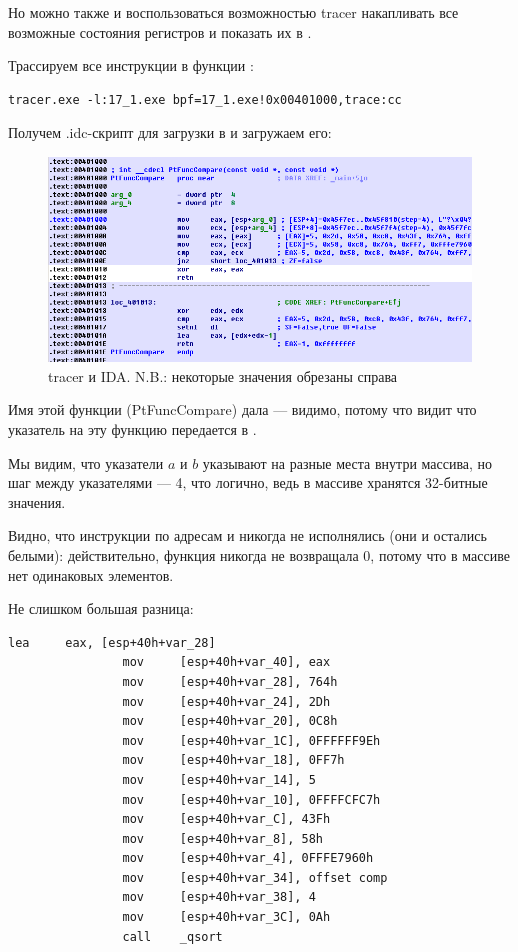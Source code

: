 \clearpage
{}

Но можно также и воспользоваться возможностью tracer накапливать все возможные состояния регистров и показать их в \IDA.

Трассируем все инструкции в функции \comp:

\begin{lstlisting}
tracer.exe -l:17_1.exe bpf=17_1.exe!0x00401000,trace:cc
\end{lstlisting}

Получем .idc-скрипт для загрузки в \IDA и загружаем его:

\begin{figure}[H]
\centering
\includegraphics[scale=\FigScale]{patterns/18_pointers_to_functions/tracer_cc.png}
\caption{tracer и IDA. N.B.: 
некоторые значения обрезаны справа}
\label{fig:qsort_tracer_cc}
\end{figure}

Имя этой функции (PtFuncCompare) дала \IDA --- видимо, потому что видит что указатель на эту функцию передается в \qsort.

Мы видим, что указатели $a$ и $b$ указывают на разные места внутри массива, 
но шаг между указателями --- 4, что логично, ведь в массиве хранятся 32-битные значения.

Видно, что инструкции по адресам  и  никогда не исполнялись (они и остались белыми): 
действительно, функция \comp никогда не возвращала 0,
потому что в массиве нет одинаковых элементов.


Не слишком большая разница:

\begin{lstlisting}[caption=GCC]
                lea     eax, [esp+40h+var_28]
                mov     [esp+40h+var_40], eax
                mov     [esp+40h+var_28], 764h
                mov     [esp+40h+var_24], 2Dh
                mov     [esp+40h+var_20], 0C8h
                mov     [esp+40h+var_1C], 0FFFFFF9Eh
                mov     [esp+40h+var_18], 0FF7h
                mov     [esp+40h+var_14], 5
                mov     [esp+40h+var_10], 0FFFFCFC7h
                mov     [esp+40h+var_C], 43Fh
                mov     [esp+40h+var_8], 58h
                mov     [esp+40h+var_4], 0FFFE7960h
                mov     [esp+40h+var_34], offset comp
                mov     [esp+40h+var_38], 4
                mov     [esp+40h+var_3C], 0Ah
                call    _qsort
\end{lstlisting}

